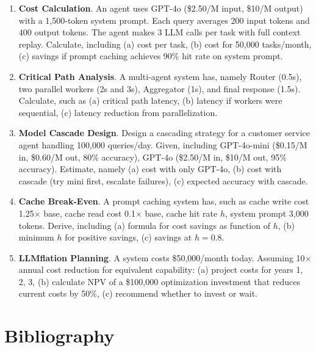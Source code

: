 \begin{enumerate}
\item \textbf{Cost Calculation}. An agent uses GPT-4o (\$2.50/M input, \$10/M output) with a 1,500-token system prompt. Each query averages 200 input tokens and 400 output tokens. The agent makes 3 LLM calls per task with full context replay. Calculate, including (a) cost per task, (b) cost for 50,000 tasks/month, (c) savings if prompt caching achieves 90\% hit rate on system prompt.

\item \textbf{Critical Path Analysis}. A multi-agent system has, namely Router (0.5s), two parallel workers (2s and 3s), Aggregator (1s), and final response (1.5s). Calculate, such as (a) critical path latency, (b) latency if workers were sequential, (c) latency reduction from parallelization.

\item \textbf{Model Cascade Design}. Design a cascading strategy for a customer service agent handling 100,000 queries/day. Given, including GPT-4o-mini (\$0.15/M in, \$0.60/M out, 80\% accuracy), GPT-4o (\$2.50/M in, \$10/M out, 95\% accuracy). Estimate, namely (a) cost with only GPT-4o, (b) cost with cascade (try mini first, escalate failures), (c) expected accuracy with cascade.

\item \textbf{Cache Break-Even}. A prompt caching system has, such as cache write cost 1.25$\times$ base, cache read cost 0.1$\times$ base, cache hit rate $h$, system prompt 3,000 tokens. Derive, including (a) formula for cost savings as function of $h$, (b) minimum $h$ for positive savings, (c) savings at $h = 0.8$.

\item \textbf{LLMflation Planning}. A system costs \$50,000/month today. Assuming 10$\times$ annual cost reduction for equivalent capability: (a) project costs for years 1, 2, 3, (b) calculate NPV of a \$100,000 optimization investment that reduces current costs by 50\%, (c) recommend whether to invest or wait.
\end{enumerate}

\section*{Bibliography}

